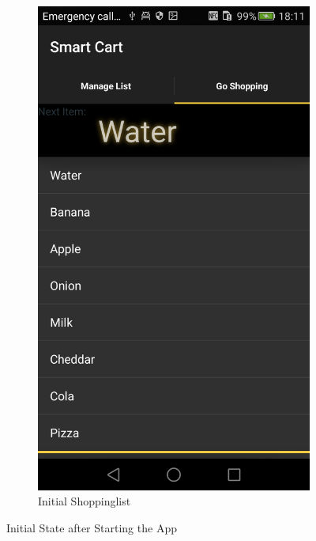 \begin{figure}[h]
\begin{subfigure}{0.475\textwidth}
\end{subfigure} \hspace{0.05\textwidth}
\begin{subfigure}{0.475\textwidth}
\centering 
\includegraphics[height= 0.35\textheight]{res/usermanual/initialShoppinglist.png}
\caption{Initial Shoppinglist}
\label{fig:initial}
\end{subfigure}
\caption{Initial State after Starting the App}
\label{fig:initialState}
\end{figure}


